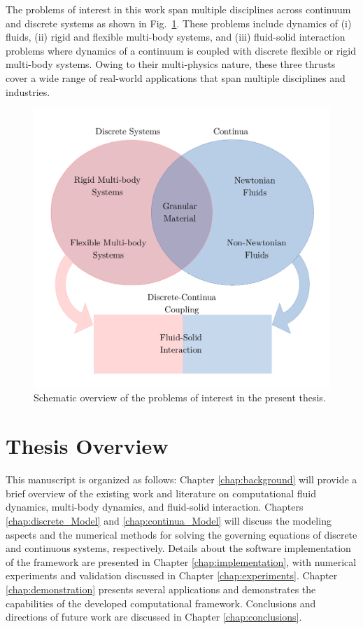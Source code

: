 The problems of interest in this work span multiple disciplines across continuum and discrete systems as shown in Fig.~\ref{fig:Overview}. These problems include dynamics of (i) fluids, (ii) rigid and flexible multi-body systems, and (iii) fluid-solid interaction problems where dynamics of a continuum is coupled with discrete flexible or rigid multi-body systems. Owing to their multi-physics nature, these three thrusts cover a wide range of real-world applications that span multiple disciplines and industries. 
\begin{figure}[H]
	\begin{center}
		\includegraphics[width=.75\linewidth]{images/Overview.pdf}
	\end{center}
	\caption{Schematic overview of the problems of interest in the present thesis.}
	\label{fig:Overview}
\end{figure}


\section{Thesis Overview}
This manuscript is organized as follows: Chapter \ref{chap:background} will provide a brief overview of the existing work and literature on computational fluid dynamics, multi-body dynamics, and fluid-solid interaction. Chapters \ref{chap:discrete_Model} and \ref{chap:continua_Model} will discuss the modeling aspects and the numerical methods for solving the governing equations of discrete and continuous systems, respectively. Details about the software implementation of the  framework are presented in Chapter \ref{chap:implementation}, with numerical experiments and validation discussed in Chapter \ref{chap:experiments}. Chapter \ref{chap:demonstration} presents several applications and demonstrates the capabilities of the developed computational framework. Conclusions and directions of future work are discussed in Chapter \ref{chap:conclusions}.




